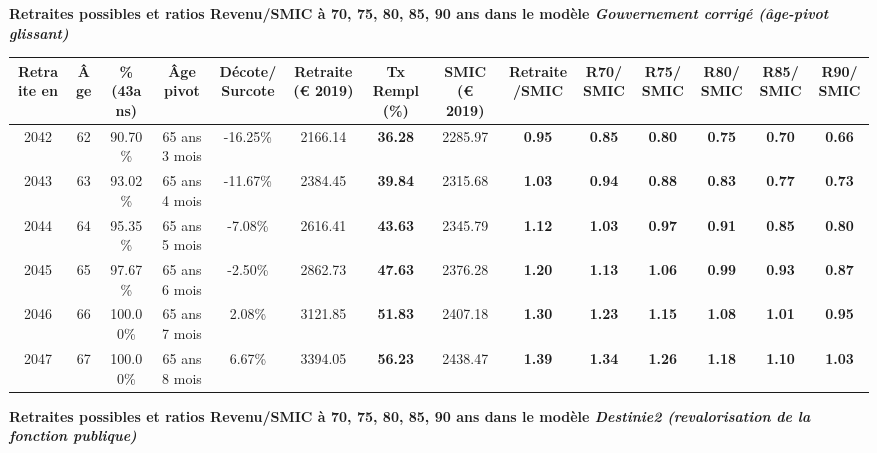  \vspace{0.1cm} 
{\bf \noindent Retraites possibles et ratios Revenu/SMIC à 70, 75, 80, 85, 90 ans dans le modèle \emph{Gouvernement corrigé (âge-pivot glissant)}}  
 
\begin{adjustbox}{max width=\textwidth} 
\begin{tabular}[htb]{|c|c||c|c|c||c|c||c|c||c|c|c|c|c|} 
\hline 
 Retraite en &  Âge &  \%(43ans) &  Âge pivot &  Décote/Surcote &  Retraite (\euro{} 2019) &  Tx Rempl(\%) &  SMIC (\euro{} 2019) &  Retraite/SMIC &  R70/SMIC &  R75/SMIC &  R80/SMIC &  R85/SMIC &  R90/SMIC \\ 
\hline \hline 
 2042 &  62 &  90.70\% &  65 ans 3 mois &  -16.25\% &  2166.14 &  {\bf 36.28} &  2285.97 &  {\bf {\color{red} 0.95}} &  {\bf {\color{red} 0.85}} &  {\bf {\color{red} 0.80}} &  {\bf {\color{red} 0.75}} &  {\bf {\color{red} 0.70}} &  {\bf {\color{red} 0.66}} \\ 
\hline 
 2043 &  63 &  93.02\% &  65 ans 4 mois &  -11.67\% &  2384.45 &  {\bf 39.84} &  2315.68 &  {\bf 1.03} &  {\bf {\color{red} 0.94}} &  {\bf {\color{red} 0.88}} &  {\bf {\color{red} 0.83}} &  {\bf {\color{red} 0.77}} &  {\bf {\color{red} 0.73}} \\ 
\hline 
 2044 &  64 &  95.35\% &  65 ans 5 mois &  -7.08\% &  2616.41 &  {\bf 43.63} &  2345.79 &  {\bf 1.12} &  {\bf 1.03} &  {\bf {\color{red} 0.97}} &  {\bf {\color{red} 0.91}} &  {\bf {\color{red} 0.85}} &  {\bf {\color{red} 0.80}} \\ 
\hline 
 2045 &  65 &  97.67\% &  65 ans 6 mois &  -2.50\% &  2862.73 &  {\bf 47.63} &  2376.28 &  {\bf 1.20} &  {\bf 1.13} &  {\bf 1.06} &  {\bf {\color{red} 0.99}} &  {\bf {\color{red} 0.93}} &  {\bf {\color{red} 0.87}} \\ 
\hline 
 2046 &  66 &  100.00\% &  65 ans 7 mois &  2.08\% &  3121.85 &  {\bf 51.83} &  2407.18 &  {\bf 1.30} &  {\bf 1.23} &  {\bf 1.15} &  {\bf 1.08} &  {\bf 1.01} &  {\bf {\color{red} 0.95}} \\ 
\hline 
 2047 &  67 &  100.00\% &  65 ans 8 mois &  6.67\% &  3394.05 &  {\bf 56.23} &  2438.47 &  {\bf 1.39} &  {\bf 1.34} &  {\bf 1.26} &  {\bf 1.18} &  {\bf 1.10} &  {\bf 1.03} \\ 
\hline 
\hline 
\end{tabular} 
\end{adjustbox} 
 
 \vspace{0.1cm} 
{\bf \noindent Retraites possibles et ratios Revenu/SMIC à 70, 75, 80, 85, 90 ans dans le modèle \emph{Destinie2 (revalorisation de la fonction publique)}}  
 
